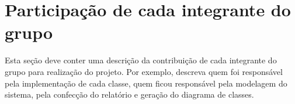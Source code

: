 \documentclass[]{article}
\begin{document}
\section{Participação de cada integrante do grupo}
Esta seção deve conter uma descrição da contribuição de cada integrante do grupo para realização do projeto. Por exemplo, descreva quem foi responsável pela implementação de cada classe, quem ficou responsável pela modelagem do sistema, pela confecção do relatório e geração do diagrama de classes.
\end{document}

